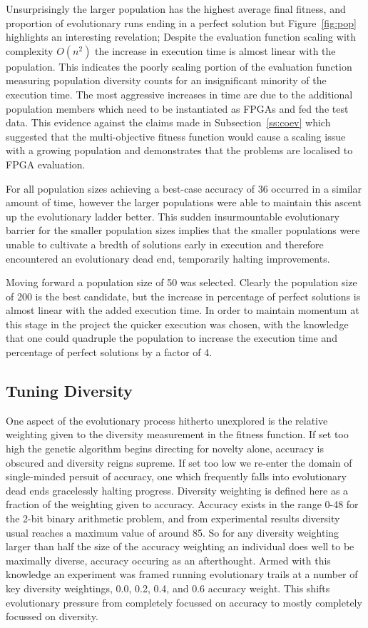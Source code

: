 Unsurprisingly the larger population has the highest average final fitness,
and proportion of evolutionary runs ending in a perfect solution but
Figure~\ref{fig:pop} highlights an interesting revelation; Despite the evaluation
function scaling with complexity $O(n^2)$ the increase in execution time is
almost linear with the population. This indicates the poorly scaling portion of
the evaluation function measuring population diversity counts for an insignificant
minority of the execution time. The most aggressive increases in time are due to
the additional population members which need to be instantiated as FPGAs and
fed the test data. This evidence against the claims made in
Subsection~\ref{ss:coev} which suggested that the multi-objective fitness function
would cause a scaling issue with a growing population and
demonstrates that the problems are localised to FPGA evaluation.

For all population sizes achieving a best-case accuracy of 36 occurred in a
similar amount of time, however the larger populations were able to maintain
this ascent up the evolutionary ladder better. This sudden insurmountable
evolutionary barrier for the smaller population sizes implies that the smaller
populations were unable to cultivate a bredth of solutions early in execution
and therefore encountered an evolutionary dead end, temporarily halting improvements.

Moving forward a population size of 50 was selected. Clearly the population size
of 200 is the best candidate, but the increase in percentage of perfect solutions is almost
linear with the added execution time. In order to maintain momentum at this stage
in the project the quicker execution was chosen, with the knowledge that one could
quadruple the population to increase the execution time and percentage of perfect
solutions by a factor of 4.

\subsection{Tuning Diversity}

One aspect of the evolutionary process hitherto unexplored is the relative
weighting given to the diversity measurement in the fitness function. If
set too high the genetic algorithm begins directing for novelty alone,
accuracy is obscured and diversity reigns supreme. If set too low we re-enter
the domain of single-minded persuit of accuracy, one which frequently
falls into evolutionary dead ends gracelessly halting progress. Diversity
weighting is defined here as a fraction of the weighting given to accuracy.
Accuracy exists in the range 0-48 for the 2-bit binary arithmetic problem,
and from experimental results diversity usual reaches a maximum value of
around 85. So for any diversity weighting larger than half the size of
the accuracy weighting an individual does well to be maximally diverse,
accuracy occuring as an afterthought. Armed with this knowledge an experiment
was framed running evolutionary
trails at a number of key diversity weightings, 0.0, 0.2, 0.4, and 0.6 accuracy weight.
This shifts evolutionary pressure from completely focussed on accuracy to mostly
completely focussed on diversity.

